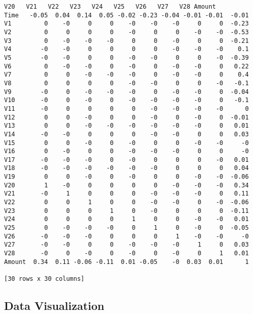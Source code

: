 \documentclass[11pt]{article}
\begin{document}
\begin{Verbatim}[commandchars=\\\{\}]
         V20   V21   V22   V23   V24   V25   V26   V27   V28 Amount  
Time   -0.05  0.04  0.14  0.05 -0.02 -0.23 -0.04 -0.01 -0.01  -0.01  
V1         0    -0     0     0    -0    -0    -0     0     0  -0.23  
V2         0     0     0     0    -0     0     0    -0    -0  -0.53  
V3         0    -0    -0    -0     0     0    -0     0     0  -0.21  
V4        -0    -0     0     0     0     0    -0    -0    -0    0.1  
V5        -0    -0     0     0    -0    -0     0     0    -0  -0.39  
V6         0    -0    -0     0    -0     0    -0    -0     0   0.22  
V7         0     0    -0    -0    -0     0    -0    -0     0    0.4  
V8         0     0     0     0    -0    -0     0     0    -0   -0.1  
V9        -0     0    -0    -0    -0     0    -0    -0     0  -0.04  
V10       -0     0    -0     0    -0    -0    -0    -0     0   -0.1  
V11       -0     0     0     0     0    -0    -0    -0    -0      0  
V12        0     0    -0     0     0    -0     0    -0     0  -0.01  
V13        0     0    -0    -0    -0    -0    -0    -0     0   0.01  
V14       -0    -0     0     0     0    -0    -0     0     0   0.03  
V15        0     0    -0     0    -0     0     0    -0    -0     -0  
V16        0    -0     0     0    -0    -0    -0     0     0     -0  
V17       -0    -0    -0     0    -0     0     0     0    -0   0.01  
V18       -0    -0    -0    -0    -0    -0     0     0     0   0.04  
V19        0     0    -0     0    -0     0     0    -0    -0  -0.06  
V20        1    -0     0     0     0     0    -0    -0    -0   0.34  
V21       -0     1     0     0     0    -0    -0    -0     0   0.11  
V22        0     0     1     0     0    -0    -0     0    -0  -0.06  
V23        0     0     0     1     0    -0     0     0     0  -0.11  
V24        0     0     0     0     1     0     0    -0    -0   0.01  
V25        0    -0    -0    -0     0     1     0    -0     0  -0.05  
V26       -0    -0    -0     0     0     0     1    -0    -0     -0  
V27       -0    -0     0     0    -0    -0    -0     1     0   0.03  
V28       -0     0    -0     0    -0     0    -0     0     1   0.01  
Amount  0.34  0.11 -0.06 -0.11  0.01 -0.05    -0  0.03  0.01      1  

[30 rows x 30 columns]

    \end{Verbatim}

    \subsection{Data Visualization}\label{data-visualization}
\end{document}
